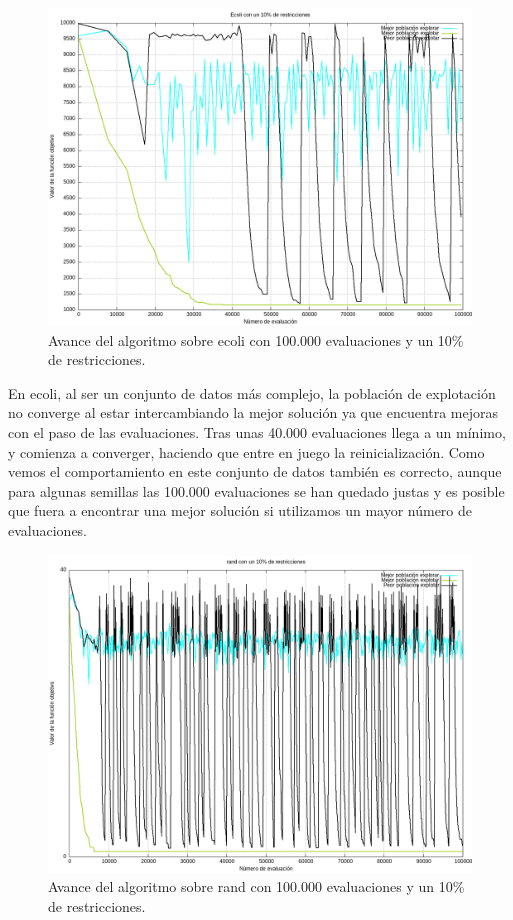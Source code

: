 \documentclass[12pt, spanish]{article}
\begin{document}
\begin{figure}[H]
	\centering
	\includegraphics[scale = 0.5]{ecoli_1.png}
	
	\caption{Avance del algoritmo sobre ecoli con 100.000 evaluaciones y un 10\% de restricciones.}
	\label{fig:ecoli_1}
\end{figure}

En ecoli, al ser un conjunto de datos más complejo, la población de explotación no converge al estar intercambiando la mejor solución ya que encuentra mejoras con el paso de las evaluaciones. Tras unas 40.000 evaluaciones llega a un mínimo, y comienza a converger, haciendo que entre en juego la reinicialización. Como vemos el comportamiento en este conjunto de datos también es correcto, aunque para algunas semillas las 100.000 evaluaciones se han quedado justas y es posible que fuera a encontrar una mejor solución si utilizamos un mayor número de evaluaciones.

\begin{figure}[H]
	\centering
	\includegraphics[scale = 0.5]{rand_1.png}
	
	\caption{Avance del algoritmo sobre rand con 100.000 evaluaciones y un 10\% de restricciones.}
	\label{fig:rand_1}
\end{figure}
\end{document}
